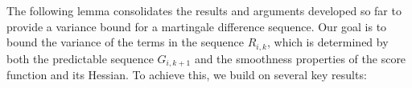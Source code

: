
The following lemma consolidates the results and arguments developed so far to provide a variance bound for a martingale difference sequence. Our goal is to bound the variance of the terms in the sequence \(R_{i,k}\), which is determined by both the predictable sequence \(G_{i,k+1}\) and the smoothness properties of the score function and its Hessian. To achieve this, we build on several key results: 

